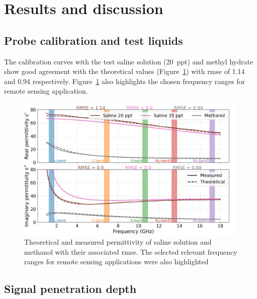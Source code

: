\section{Results and discussion}

\subsection{Probe calibration and test liquids}\label{subsec:res-calib}
The calibration curves with the test saline solution (\qty{20}{ppt}) and methyl hydrate show good agreement with the theoretical values \parencite{Nyshadham1992} (Figure~\ref{fig:calib-results}) with \ac{rmse} of \num{1.14} and \num{0.94} respectively.
Figure~\ref{fig:calib-results} also highlights the chosen frequency ranges for remote sensing application.

\begin{figure}[ht!]
    \centering
    \includegraphics[width=\columnwidth]{Images/calibration-results.png}
    \caption[]{Theoretical and measured permittivity of saline solution and methanol with their associated \ac{rmse}. The selected relevant frequency ranges for remote sensing applications were also highlighted}\label{fig:calib-results}
\end{figure}

\subsection{Signal penetration depth}

